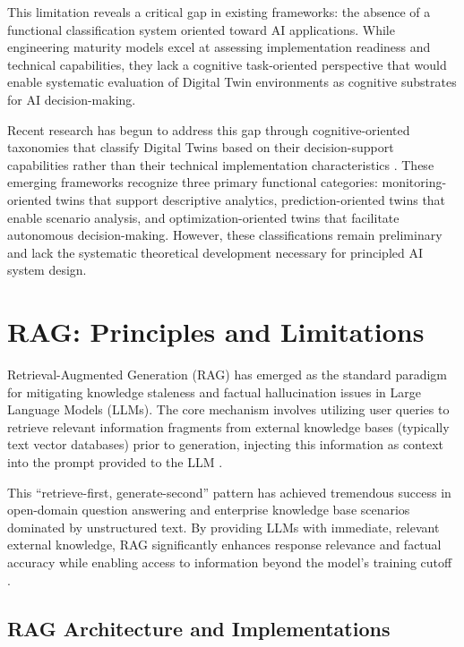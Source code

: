 This limitation reveals a critical gap in existing frameworks: the absence of a functional classification system oriented toward AI applications. While engineering maturity models excel at assessing implementation readiness and technical capabilities, they lack a cognitive task-oriented perspective that would enable systematic evaluation of Digital Twin environments as cognitive substrates for AI decision-making.

Recent research has begun to address this gap through cognitive-oriented taxonomies that classify Digital Twins based on their decision-support capabilities rather than their technical implementation characteristics \cite{jones2020cognitive, negri2017review}. These emerging frameworks recognize three primary functional categories: monitoring-oriented twins that support descriptive analytics, prediction-oriented twins that enable scenario analysis, and optimization-oriented twins that facilitate autonomous decision-making. However, these classifications remain preliminary and lack the systematic theoretical development necessary for principled AI system design.

\section{RAG: Principles and Limitations}

Retrieval-Augmented Generation (RAG) has emerged as the standard paradigm for mitigating knowledge staleness and factual hallucination issues in Large Language Models (LLMs). The core mechanism involves utilizing user queries to retrieve relevant information fragments from external knowledge bases (typically text vector databases) prior to generation, injecting this information as context into the prompt provided to the LLM \cite{lewis2020retrieval, karpukhin2020dense}.

This ``retrieve-first, generate-second'' pattern has achieved tremendous success in open-domain question answering and enterprise knowledge base scenarios dominated by unstructured text. By providing LLMs with immediate, relevant external knowledge, RAG significantly enhances response relevance and factual accuracy while enabling access to information beyond the model's training cutoff \cite{guu2020retrieval}.

\subsection{RAG Architecture and Implementations}

